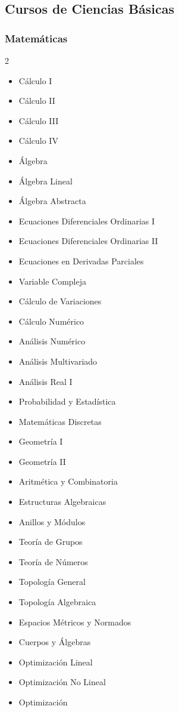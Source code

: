 \documentclass[12pt,a4paper]{article}
\begin{document}
	\subsection{Cursos de Ciencias Básicas}
	
	\subsubsection{Matemáticas}
	\begin{multicols}{2}
		\begin{itemize}
			\item Cálculo I
			\item Cálculo II
			\item Cálculo III
			\item Cálculo IV
			\item Álgebra
			\item Álgebra Lineal
			\item Álgebra Abstracta
			\item Ecuaciones Diferenciales Ordinarias I
			\item Ecuaciones Diferenciales Ordinarias II
			\item Ecuaciones en Derivadas Parciales
			\item Variable Compleja
			\item Cálculo de Variaciones
			\item Cálculo Numérico
			\item Análisis Numérico
			\item Análisis Multivariado
			\item Análisis Real I
			\item Probabilidad y Estadística
			\item Matemáticas Discretas
			\item Geometría I
			\item Geometría II
			\item Aritmética y Combinatoria
			\item Estructuras Algebraicas
			\item Anillos y Módulos
			\item Teoría de Grupos
			\item Teoría de Números
			\item Topología General
			\item Topología Algebraica
			\item Espacios Métricos y Normados
			\item Cuerpos y Álgebras
			\item Optimización Lineal
			\item Optimización No Lineal
			\item Optimización
		\end{itemize}
	\end{multicols}
	
\end{document}
